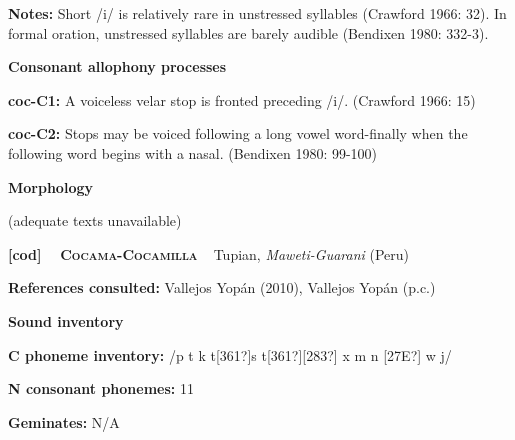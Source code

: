 \begin{styleBody}
\textbf{Notes: }Short /i/ is relatively rare in unstressed syllables (Crawford 1966: 32). In formal oration, unstressed syllables are barely audible (Bendixen 1980: 332-3).
\end{styleBody}

\begin{styleBody}
\textbf{Consonant allophony processes}
\end{styleBody}

\begin{styleBody}
\textbf{coc-C1: }A voiceless velar stop is fronted preceding /i/. (Crawford 1966: 15)
\end{styleBody}

\begin{styleBody}
\textbf{coc-C2: }Stops may be voiced following a long vowel word-finally when the following word begins with a nasal. (Bendixen 1980: 99-100)
\end{styleBody}

\begin{styleBody}
\textbf{Morphology}
\end{styleBody}

\begin{styleBody}
(adequate texts unavailable)
\end{styleBody}

\clearpage\begin{styleBody}
\textbf{[cod] }\ \ \textbf{\textsc{Cocama-Cocamilla}}\textbf{\ \ }Tupian, \textit{Maweti-Guarani }(Peru)
\end{styleBody}

\begin{styleBody}
\textbf{References consulted: }Vallejos Yopán (2010), Vallejos Yopán (p.c.)
\end{styleBody}

\begin{styleBody}
\textbf{Sound inventory}
\end{styleBody}

\begin{styleBody}
\textbf{C phoneme inventory:} /p t k t[361?]s t[361?][283?] x m n [27E?] w j/
\end{styleBody}

\begin{styleBody}
\textbf{N consonant phonemes:} 11
\end{styleBody}

\begin{styleBody}
\textbf{Geminates:} N/A
\end{styleBody}

